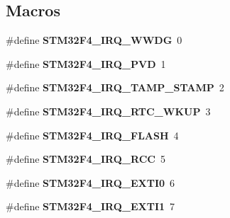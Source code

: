 \subsection*{Macros}
\begin{DoxyCompactItemize}
\item 
\mbox{\label{group__stm32f4__interrupt_ga0d28329e11efe17167b32f411208ebea}} 
\#define {\bfseries S\+T\+M32\+F4\+\_\+\+I\+R\+Q\+\_\+\+W\+W\+DG}~0
\item 
\mbox{\label{group__stm32f4__interrupt_ga8f41864721511d8ba73873a0d0b9f448}} 
\#define {\bfseries S\+T\+M32\+F4\+\_\+\+I\+R\+Q\+\_\+\+P\+VD}~1
\item 
\mbox{\label{group__stm32f4__interrupt_ga1ac1bf83b93038c6425b438334f63933}} 
\#define {\bfseries S\+T\+M32\+F4\+\_\+\+I\+R\+Q\+\_\+\+T\+A\+M\+P\+\_\+\+S\+T\+A\+MP}~2
\item 
\mbox{\label{group__stm32f4__interrupt_gad01570fa6f77b9af1d69a211180f2782}} 
\#define {\bfseries S\+T\+M32\+F4\+\_\+\+I\+R\+Q\+\_\+\+R\+T\+C\+\_\+\+W\+K\+UP}~3
\item 
\mbox{\label{group__stm32f4__interrupt_ga18d46fa7defd06025388d709fee09c47}} 
\#define {\bfseries S\+T\+M32\+F4\+\_\+\+I\+R\+Q\+\_\+\+F\+L\+A\+SH}~4
\item 
\mbox{\label{group__stm32f4__interrupt_ga3c60fb12456f32058a0429b972a6c489}} 
\#define {\bfseries S\+T\+M32\+F4\+\_\+\+I\+R\+Q\+\_\+\+R\+CC}~5
\item 
\mbox{\label{group__stm32f4__interrupt_gaea149b2d0dfd7cd748569df75dd5e82f}} 
\#define {\bfseries S\+T\+M32\+F4\+\_\+\+I\+R\+Q\+\_\+\+E\+X\+T\+I0}~6
\item 
\mbox{\label{group__stm32f4__interrupt_gac3fc8a9c28f3ecfa82a3f3632a75abec}} 
\#define {\bfseries S\+T\+M32\+F4\+\_\+\+I\+R\+Q\+\_\+\+E\+X\+T\+I1}~7
\item 
\mbox{\label{group__stm32f4__interrupt_ga8290066cf18bf60360c53ac1a839c932}} 

\end{DoxyCompactItemize}

